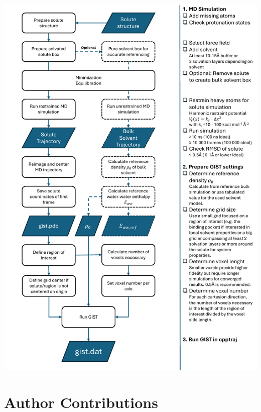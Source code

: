 \documentclass[9pt,tutorial]{livecoms}
\begin{document}
	\begin{Checklists*}
	\includegraphics[width=0.9\linewidth,page=2]{figures/flowchart_GIST.pdf}
\end{Checklists*}
\FloatBarrier

\section*{Author Contributions}
\end{document}
